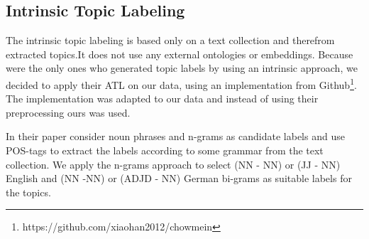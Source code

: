 \subsection{Intrinsic Topic Labeling}
\label{sec:intrinsic}
The intrinsic topic labeling is based only on a text collection and therefrom extracted topics.It does not use any external ontologies or embeddings. Because \textit{\cite{Mei2007}} were the only ones who generated topic labels by using an intrinsic approach, we decided to apply their \ac{ATL} on our data, using an implementation from Github\footnote{https://github.com/xiaohan2012/chowmein}. The implementation was adapted to our data and instead of using their preprocessing ours was used.

In their paper \textit{\cite{Mei2007}} consider noun phrases and n-grams as candidate labels and use \ac{POS}-tags to extract the labels according to some grammar from the text collection. We apply the n-grams approach to select (NN - NN) or (JJ - NN) English and (NN -NN) or (ADJD - NN) German bi-grams as suitable labels for the topics.

